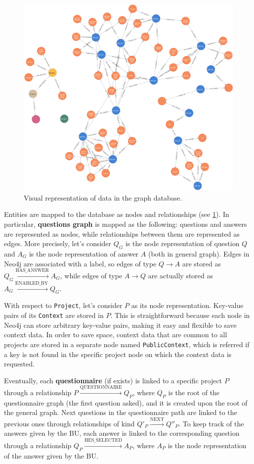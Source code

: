 \documentclass[12pt,a4paper,openright,twoside]{book}
\begin{document}
\begin{figure}
    \centering
    \includegraphics[width=0.72\linewidth]{figures/graph-db.png}
    \caption{
        Visual representation of data in the graph database.
    }
    \label{fig:graph-db}
\end{figure}

Entities are mapped to the database as nodes and relationships (see \cref{fig:graph-db}).
%
In particular, \textbf{questions graph} is mapped as the following: questions and answers are represented as nodes, while relationships between them are represented as edges.
%
More precisely, let's consider $Q_G$ is the node representation of question $Q$ and $A_G$ is the node representation of answer $A$ (both in general graph).
%
Edges in Neo4j are associated with a label, so edges of type $Q \to A$ are stored as $Q_G \xrightarrow{\text{HAS\_ANSWER}} A_G$, while edges of type $A \to Q$ are actually stored as $A_G \xrightarrow{\text{ENABLED\_BY}} Q_G$.


With respect to \texttt{Project}, let's consider $P$ as its node representation.
%
Key-value pairs of its \texttt{Context} are stored in $P$.
%
This is straightforward because each node in Neo4j can store arbitrary key-value pairs, making it easy and flexible to save context data.
%
In order to save space, context data that are common to all projects are stored in a separate node named \texttt{PublicContext}, which is referred if a key is not found in the specific project node on which the context data is requested.

Eventually, each \textbf{questionnaire} (if exists) is linked to a specific project $P$ through a relationship $P \xrightarrow{\text{QUESTIONNAIRE}} Q_P$, where $Q_P$ is the root of the questionnaire graph (the first question asked), and it is created upon the root of the general graph.
%
Next questions in the questionnaire path are linked to the previous ones through relationships of kind $Q'_P \xrightarrow{\text{NEXT}} Q''_P$.
%
To keep track of the answers given by the \ac{BU}, each answer is linked to the corresponding question through a relationship $Q_P \xrightarrow{\text{HES\_SELECTED}} A_P$, where $A_P$ is the node representation of the answer given by the \ac{BU}.
\end{document}
